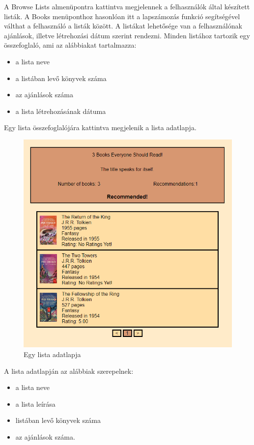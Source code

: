 \bigskip

A Browse Lists almenüpontra kattintva megjelennek a felhasználók által készített listák. A Books menüponthoz hasonlóan itt a lapszámozás funkció segítségével válthat a felhasználó a listák között. A listákat lehetősége van a felhasználónak ajánlások, illetve létrehozási dátum szerint rendezni. Minden listához tartozik egy összefoglaló, ami az alábbiakat tartalmazza:
\begin{itemize}
    \item a lista neve
    \item a listában levő könyvek száma
    \item az ajánlások száma
    \item a lista létrehozásának dátuma
\end{itemize}
 Egy lista összefoglalójára kattintva megjelenik a lista adatlapja.

\bigskip

\begin{figure}[H]
    \centering
    \includegraphics[scale=0.65]{images/application/listcard.png}
    \caption{Egy lista adatlapja}
\end{figure}

\noindent A lista adatlapján az alábbiak szerepelnek:
\begin{itemize}
    \item a lista neve
    \item a lista leírása
    \item listában levő könyvek száma
    \item az ajánlások száma.
\end{itemize}

